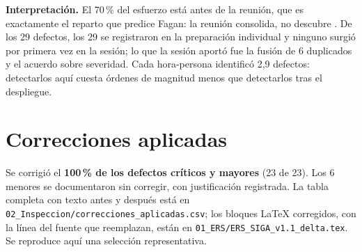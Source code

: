 \documentclass[11pt,letterpaper]{article}
\begin{document}
\textbf{Interpretación.} El 70\,\% del esfuerzo está antes de la reunión, que es exactamente el reparto que predice Fagan: la reunión consolida, no descubre \cite{fagan1976}. De los 29 defectos, los 29 se registraron en la preparación individual y ninguno surgió por primera vez en la sesión; lo que la sesión aportó fue la fusión de 6 duplicados y el acuerdo sobre severidad. Cada hora-persona identificó 2,9 defectos: detectarlos aquí cuesta órdenes de magnitud menos que detectarlos tras el despliegue.

\section{Correcciones aplicadas}

Se corrigió el \textbf{100\,\% de los defectos críticos y mayores} (23 de 23). Los 6 menores se documentaron sin corregir, con justificación registrada. La tabla completa con texto antes y después está en \texttt{02\_Inspeccion/correcciones\_aplicadas.csv}; los bloques \LaTeX{} corregidos, con la línea del fuente que reemplazan, están en \texttt{01\_ERS/ERS\_SIGA\_v1.1\_delta.tex}. Se reproduce aquí una selección representativa.
\end{document}
